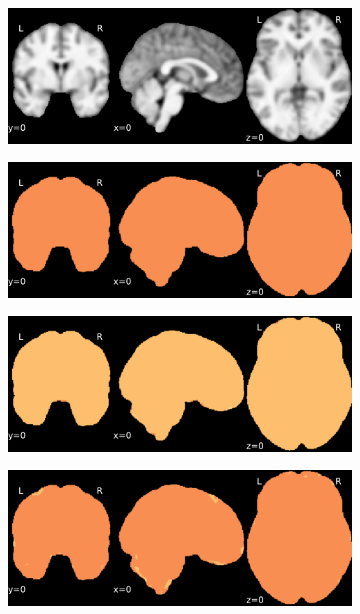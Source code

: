 \documentclass{article}
\begin{document}
\begin{landscape}
\begin{figure}
        \begin{subfigure}[t]{0.2\paperheight}
            \centering
            \includegraphics[width=\textwidth]{figures/ieee_T1/fwhm_5/ieee_ds000256_sub-CTS201.pdf}
        \end{subfigure}
        \begin{subfigure}[t]{0.2\paperheight}
            \centering
            \includegraphics[width=\textwidth]{figures/sig/fwhm_5/rr_ds000256_sub-CTS201_sig.pdf}
        \end{subfigure}
        \begin{subfigure}[t]{0.2\paperheight}
            \centering
            \includegraphics[width=\textwidth]{figures/sig/fwhm_5/rs_ds000256_sub-CTS201_sig.pdf}
        \end{subfigure}
        \begin{subfigure}[t]{0.2\paperheight}
            \centering
            \includegraphics[width=\textwidth]{figures/sig/fwhm_5/rr.rs_ds000256_sub-CTS201_sig.pdf}

\end{subfigure}
\end{figure}
\end{landscape}
\end{document}
